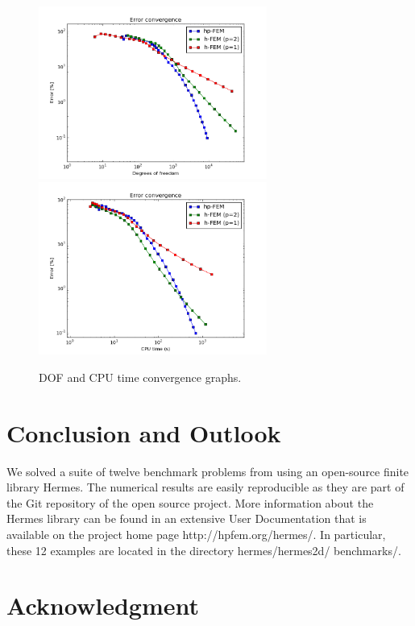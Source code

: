 \documentclass[12pt]{elsarticle}
\begin{document}
\begin{figure}[H]
\centering
\hspace{-50mm}
\includegraphics[width=7.5cm]{nist/nist-12/conv_dof_aniso.png}\ \
\hspace{-10mm}
\includegraphics[width=7.5cm]{nist/nist-12/conv_cpu_aniso.png}
\hspace{-50mm}
\caption{DOF and CPU time convergence graphs.}
\label{fig:nist-12-conv}
\end{figure}
\vspace{-8mm}

\section{Conclusion and Outlook}
\label{sec:conclusion}

We solved a suite of twelve benchmark problems from \cite{mitchell-1}
using an open-source finite library Hermes. The numerical results are 
easily reproducible as they are part of the Git repository of the 
open source project. More information about the Hermes library can be found 
in an extensive User Documentation that is available on the project home 
page http://hpfem.org/hermes/. In particular, these 12 examples are located
in the directory hermes/hermes2d/ benchmarks/.

\section{Acknowledgment}
\end{document}
